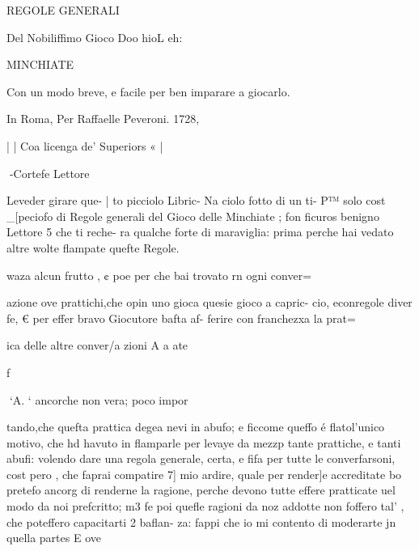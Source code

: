  

 
 

REGOLE GENERALI

Del Nobiliffimo Gioco
Doo hioL eh:

MINCHIATE

Con un modo breve, e facile
per ben imparare a giocarlo.

 

 

 

In Roma, Per Raffaelle Peveroni. 1728,

 

 

 

 

|
| Coa licenga de’ Superiors « |
 

 

 

 

 

 

 
-Cortefe Lettore

Leveder girare que-
| to picciolo Libric-
Na ciolo fotto di un ti-
P™ solo cost _[peciofo di
Regole generali del Gioco
delle Minchiate ; fon ficuros
benigno Lettore 5 che ti reche-
ra qualche forte di maraviglia:
prima perche hai vedato altre
wolte flampate quefte Regole.

waza alcun frutto , ¢ poe per
che bai trovato rn ogni conver=

azione ove prattichi,che opin
uno gioca quesie gioco a capric-
cio, econregole diver fe, € per
effer bravo Giocutore bafta af-
ferire con franchezxa la prat=

ica delle altre conver/a zioni
A a ate

f

 

 

 

 

 
‘A. ‘
ancorche non vera; poco impor

tando,che quefta prattica degea
nevi in abufo; e ficcome queffo
é flatol'unico motivo, che hd
havuto in flamparle per levaye
da mezzp tante prattiche, e
tanti abufi: volendo dare una
regola generale, certa, e fifa
per tutte le converfarsoni, cost
pero , che faprai compatire 7]
mio ardire, quale per render]e
accreditate bo pretefo ancorg
di renderne la ragione, perche
devono tutte effere pratticate
uel modo da noi prefcritto; m3
fe poi quefle ragioni da noz
addotte non foffero tal’ , che
poteffero capacitarti 2 baflan-
za: fappi che io mi contento
di moderarte jn quella partes
E ove

